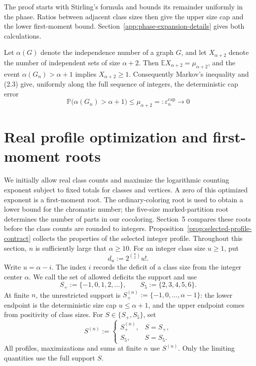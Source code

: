 \documentclass[a4paper,10pt,reqno]{amsart}
\numberwithin{equation}{section}
\theoremstyle{plain}
\theoremstyle{remark}
\begin{document}
The proof starts with Stirling's formula and bounds its remainder
uniformly in the phase. Ratios between adjacent class sizes then give the
upper size cap and the lower first-moment bound.
Section~\ref{app:phase-expansion-details} gives both calculations.

Let $\alpha(G)$ denote the independence number of a graph $G$, and let
$X_{\alpha+2}$ denote the number of independent sets of size
$\alpha+2$. Then
$\mathbb E X_{\alpha+2}=\mu_{\alpha+2}$, and the event
$\alpha(G_n)>\alpha+1$ implies $X_{\alpha+2}\ge1$. Consequently Markov's
inequality and (2.3) give, uniformly along the full sequence of integers, the
deterministic cap error
\begin{equation*}
  \mathbb P\bigl(\alpha(G_n)>\alpha+1\bigr)
  \le\mu_{\alpha+2}
  =:\varepsilon_n^{\mathrm{cap}}
  \longrightarrow0
  \tag{2.9}
\end{equation*}


\section{Real profile optimization and first-moment roots}
\label{continuous-profile-roots}

We initially allow real class counts and maximize the logarithmic counting
exponent subject to fixed totals for classes and vertices. A zero of this
optimized exponent is a first-moment root. The ordinary-coloring root is used to obtain
a lower bound for the chromatic number; the five-size marked-partition root
determines the number of parts in our cocoloring. Section~5 compares these
roots before the class counts are rounded to integers.
Proposition~\ref{prop:selected-profile-contract} collects the properties of
the selected integer profile.
Throughout this section, $n$ is sufficiently large that $\alpha\ge10$.
For an integer class size $u\ge1$, put
\[
  d_u:=2^{\binom u2}u!.
\]
Write $u=\alpha-i$. The index $i$ records the deficit of a class size from
the integer center $\alpha$. We call the set of allowed deficits the
support and use
\begin{equation*}
  S_+:=\{-1,0,1,2,\ldots\},
  \qquad
  S_5:=\{2,3,4,5,6\}.
  \tag{3.1}
\end{equation*}
At finite $n$, the unrestricted support is
$S_+^{(n)}:=\{-1,0,\ldots,\alpha-1\}$: the lower endpoint is the
deterministic size cap $u\le\alpha+1$, and the upper endpoint comes from
positivity of class sizes.
For $S\in\{S_+,S_5\}$, set
\[
  S^{(n)}:=
  \begin{cases}
    S_+^{(n)},&S=S_+,\\
    S_5,&S=S_5.
  \end{cases}
\]
All profiles, maximizations and sums at finite $n$ use $S^{(n)}$.
Only the limiting quantities use the full support $S$.
\end{document}
